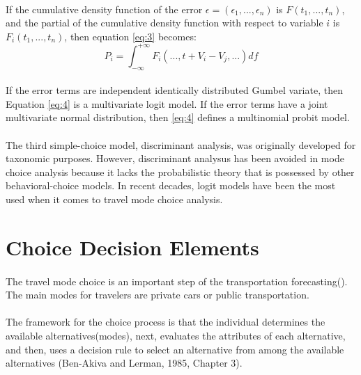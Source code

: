 \paragraph{}If the cumulative density function of the error $\epsilon =(\epsilon_1, . . . , \epsilon_n)$ is $F(t_1, . . . , t_n)$, and the partial of the cumulative density function with respect to variable $i$ is $F_i(t_1, . . . , t_n)$, then equation \ref{eq:3} becomes:
\begin{equation}\label{eq:4}
P_i = 	\int_{-\infty}^{+\infty} F_i(. . . , t + V_i - V_j, . . .)df
\end{equation}
\paragraph{}If the error terms are independent identically distributed Gumbel variate, then Equation \ref{eq:4} is a multivariate logit model. If the error terms have a joint multivariate normal distribution, then \ref{eq:4} defines a multinomial probit model. 
\paragraph{}The third simple-choice model, discriminant analysis, was originally developed for taxonomic purposes. However, discriminant analysus has been avoided in mode choice analysis because it lacks the probabilistic theory that is possessed by other behavioral-choice models. In recent decades, logit models have been the most used when it comes to travel mode choice analysis.

\section{Choice Decision Elements}
\paragraph{}The travel mode choice is an important step of the transportation forecasting(\cite{Litman,2011}). The main modes for travelers are private cars or public transportation.
\paragraph {}The framework for the choice process is that the individual determines the available alternatives(modes), next, evaluates the attributes of each alternative, and then, uses a decision rule to select an alternative from among the available alternatives (Ben-Akiva and Lerman, 1985, Chapter 3).\\
